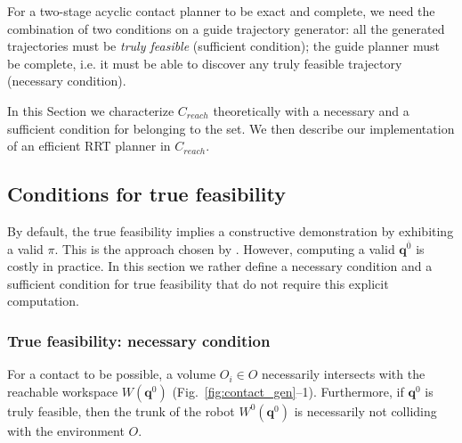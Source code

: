 For a two-stage acyclic contact planner to be exact and complete, we need the combination of two conditions on a guide trajectory generator: all the generated trajectories must be \textit{truly feasible} (sufficient condition); the guide planner must be complete, i.e. it must be able to discover any truly feasible trajectory (necessary condition).

In this Section we characterize $C_{reach}$ theoretically with a necessary and a sufficient condition for belonging to the set.
We then describe our implementation of an efficient RRT planner in $C_{reach}$.

   
 
\subsection{Conditions for true feasibility}
By default, the true feasibility implies a constructive demonstration by exhibiting a valid $\pi$. This is the approach chosen by \cite{Bouyarmane2009}. However, computing a valid  $\mathbf{q}^{\overline{0}}$ is costly in practice. In this section we rather define a necessary condition and a sufficient condition for true feasibility that do not require this explicit computation.




\subsubsection*{True feasibility: necessary condition}
For a contact to be possible, a volume $O_i \in O$ necessarily intersects with the reachable workspace $W(\mathbf{q}^{0})$ (Fig.~\ref{fig:contact_gen}--1). Furthermore, if $\mathbf{q}^{0}$ is truly feasible, then the trunk of the robot $W^0(\mathbf{q}^{0})$ is necessarily not colliding  with the environment $O$.

